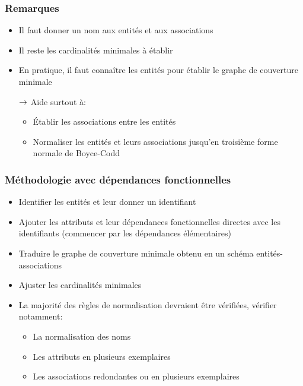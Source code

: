 \begin{frame}
  \frametitle{Remarques}
  \begin{itemize}
    \item Il faut donner un nom aux entités et aux associations
    \item Il reste les cardinalités minimales à établir
    \item En pratique, il faut connaître les entités pour établir le graphe de couverture minimale
    \item[$\rightarrow$] Aide surtout à:
      \begin{itemize}
        \item Établir les associations entre les entités
        \item Normaliser les entités et leurs associations jusqu'en troisième forme normale de Boyce-Codd 
      \end{itemize}
  \end{itemize}
\end{frame}

\begin{frame}
  \frametitle{Méthodologie avec dépendances fonctionnelles}
  \begin{itemize}
    \item Identifier les entités et leur donner un identifiant
    \item Ajouter les attributs et leur dépendances fonctionnelles directes avec les identifiants
      (commencer par les dépendances élémentaires)
    \item Traduire le graphe de couverture minimale obtenu en un schéma entités-associations
    \item Ajuster les cardinalités minimales
    \item La majorité des règles de normalisation devraient être vérifiées, vérifier notamment:
      \begin{itemize}
        \item La normalisation des noms
        \item Les attributs en plusieurs exemplaires
        \item Les associations redondantes ou en plusieurs exemplaires
      \end{itemize}
  \end{itemize}
\end{frame}


